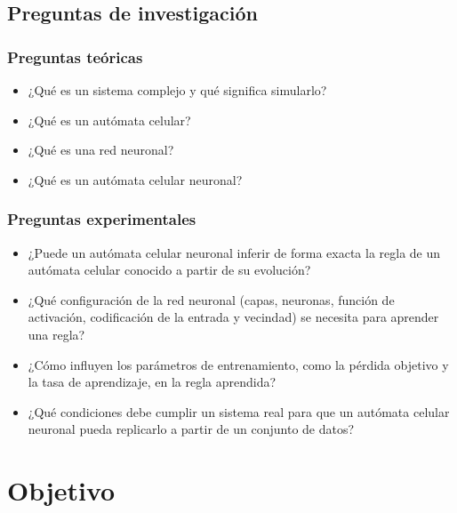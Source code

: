 \subsection{Preguntas de investigación}

\subsubsection{Preguntas teóricas}

\begin{itemize}
	
	\item ¿Qué es un sistema complejo y qué significa simularlo?
	
	\item ¿Qué es un autómata celular?
	
	\item ¿Qué es una red neuronal?
	
	\item ¿Qué es un autómata celular neuronal?
	
\end{itemize}

\subsubsection{Preguntas experimentales}

\begin{itemize}
	
	\item ¿Puede un autómata celular neuronal inferir de forma exacta la regla de un autómata celular conocido a partir de su evolución?
	
	\item ¿Qué configuración de la red neuronal (capas, neuronas, función de activación, codificación de la entrada y vecindad) se necesita para aprender una regla?
	
	\item ¿Cómo influyen los parámetros de entrenamiento, como la pérdida objetivo y la tasa de aprendizaje, en la regla aprendida?
	
	\item ¿Qué condiciones debe cumplir un sistema real para que un autómata celular neuronal pueda replicarlo a partir de un conjunto de datos?
	
\end{itemize}

\section{Objetivo}

